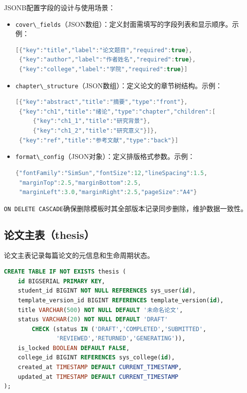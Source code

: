 JSONB配置字段的设计与使用场景：

\begin{itemize}
    \item \verb|cover\_fields|（JSON数组）：定义封面需填写的字段列表和显示顺序。示例：
    \begin{lstlisting}[language=Java]
[{"key":"title","label":"论文题目","required":true},
 {"key":"author","label":"作者姓名","required":true},
 {"key":"college","label":"学院","required":true}]
    \end{lstlisting}
    \item \verb|chapter\_structure|（JSON数组）：定义论文的章节树结构。示例：
    \begin{lstlisting}[language=Java]
[{"key":"abstract","title":"摘要","type":"front"},
 {"key":"ch1","title":"绪论","type":"chapter","children":[
     {"key":"ch1_1","title":"研究背景"},
     {"key":"ch1_2","title":"研究意义"}]},
 {"key":"ref","title":"参考文献","type":"back"}]
    \end{lstlisting}
    \item \verb|format\_config|（JSON对象）：定义排版格式参数。示例：
    \begin{lstlisting}[language=Java]
{"fontFamily":"SimSun","fontSize":12,"lineSpacing":1.5,
 "marginTop":2.5,"marginBottom":2.5,
 "marginLeft":3.0,"marginRight":2.5,"pageSize":"A4"}
    \end{lstlisting}
\end{itemize}

\verb|ON DELETE CASCADE|确保删除模板时其全部版本记录同步删除，维护数据一致性。

\subsection{论文主表（thesis）}

论文主表记录每篇论文的元信息和生命周期状态。

\begin{lstlisting}[language=SQL,caption={thesis 建表语句}]
CREATE TABLE IF NOT EXISTS thesis (
    id BIGSERIAL PRIMARY KEY,
    student_id BIGINT NOT NULL REFERENCES sys_user(id),
    template_version_id BIGINT REFERENCES template_version(id),
    title VARCHAR(500) NOT NULL DEFAULT '未命名论文',
    status VARCHAR(20) NOT NULL DEFAULT 'DRAFT'
        CHECK (status IN ('DRAFT','COMPLETED','SUBMITTED',
               'REVIEWED','RETURNED','GENERATING')),
    is_locked BOOLEAN DEFAULT FALSE,
    college_id BIGINT REFERENCES sys_college(id),
    created_at TIMESTAMP DEFAULT CURRENT_TIMESTAMP,
    updated_at TIMESTAMP DEFAULT CURRENT_TIMESTAMP
);
\end{lstlisting}

